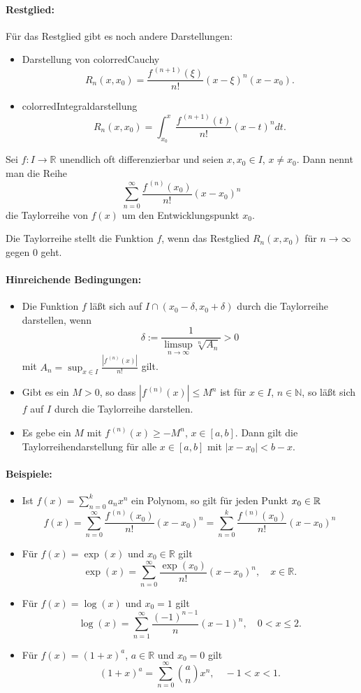 \documentclass[a4paper,12pt,DIV15]{scrartcl}
\begin{document}
\paragraph{Restglied:}
Für das Restglied gibt es noch andere Darstellungen:
\begin{itemize}
\item Darstellung von {color{red}Cauchy}
\[ R_n(x,x_0)= \frac{f^{\,(n+1)}(\xi)}{n!} (x- \xi)^{n}(x-x_0).\]
\item {color{red}Integraldarstellung}
\[ R_n(x,x_0)= \int_{x_0}^x \frac{f^{\,(n+1)}(t)}{n!}  (x-t)^n dt.\]
\end{itemize}

\begin{defn}[Taylorreihe]
Sei $f:I \rightarrow \mathbb{R}$ unendlich oft  differenzierbar und seien
$x,x_0 \in I$, $x \neq x_0$. Dann nennt man die Reihe
\[ \sum_{n=0}^\infty \frac{f^{\,(n)}(x_0)}{n!}(x-x_0)^n \]
die {\color{red} Taylorreihe} von $f(x)$ um den Entwicklungspunkt
{\color{red} $x_0$}.

\bigskip
Die Taylorreihe stellt die Funktion $f$, wenn das Restglied $R_n(x,x_0)$ für $n
\rightarrow \infty$ gegen $0$ geht.
\end{defn}

\paragraph{Hinreichende Bedingungen:}
\begin{itemize}
\item Die Funktion $f$ läßt sich auf $I\cap (x_0-\delta, x_0+\delta)$ durch die Taylorreihe darstellen, wenn
\[
\delta:= \frac{1}{\limsup_{n \rightarrow \infty} \sqrt[n]{A_n}}>0
 \]
mit $A_n=\sup_{x \in I}  \frac{|f^{\,(n)}(x)|}{n!}$ gilt.
\item Gibt es ein $M>0$, so dass $|f^{\,(n)}(x)|\leq M^n$ ist für $x \in
I$, $n \in \mathbb{N}$, so läßt sich $f$ auf $I$ durch die Taylorreihe
darstellen.
\item Es gebe ein $M$ mit  $f^{\,(n)}(x)\geq -M^n$, $x \in [a,b]$. Dann
gilt die Taylorreihendarstellung für alle $x \in [a,b]$ mit
$|x-x_0|<b-x$. 
\end{itemize}

\paragraph{Beispiele:}
\begin{itemize}
\item Ist $f(x) = \sum_{n=0}^k a_n x^n$ ein Polynom, so gilt für jeden Punkt $x_0 \in \mathbb{R}$
\[
 f(x) = \sum_{n=0}^\infty \frac{f^{\,(n)}(x_0)}{n!}(x-x_0)^n 
 = \sum_{n=0}^k  \frac{f^{\,(n)}(x_0)}{n!}(x-x_0)^n
\]
\item Für $f(x)=\exp(x)$ und $x_0 \in \mathbb{R}$ gilt 
\[ \exp(x)= \sum_{n=0}^\infty \frac{\exp(x_0)}{n!} (x-x_0)^n, \quad x
\in \mathbb{R}.\]
\item Für $f(x)=\log(x)$ und $x_0=1$ gilt
\[ \log (x) = \sum_{n=1}^\infty \frac{(-1)^{n-1}}{n}(x-1)^n, \quad 0 <
x \leq 2.\]
\item Für $f(x)= (1+x)^a$, $a\in \mathbb{R}$  und $x_0=0$ gilt
\[ (1+x)^a= \sum_{n =0}^\infty \binom{a}{n}{x^n}, \quad -1 <
x < 1. \]
\end{itemize}
\end{document}
